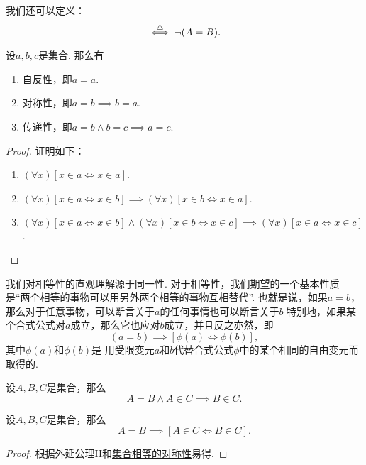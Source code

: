 我们还可以定义：\begin{equation*}
	[A \neq B] \defiff \neg(A=B).
\end{equation*}

\begin{property}
设\(a,b,c\)是集合.
那么有\begin{enumerate}
	\item\label{item:集合论.集合相等的自反性}
	自反性，即\(a=a\).
	\item\label{item:集合论.集合相等的对称性}
	对称性，即\(a=b \implies b=a\).
	\item\label{item:集合论.集合相等的传递性}
	传递性，即\(a=b \land b=c \implies a=c\).
\end{enumerate}
\begin{proof}
证明如下：
\begin{enumerate}
	\item \((\forall x)[x \in a \iff x \in a]\).
	\item \((\forall x)[x \in a \iff x \in b] \implies (\forall x)[x \in b \iff x \in a]\).
	\item \((\forall x)[x \in a \iff x \in b] \land (\forall x)[x \in b \iff x \in c]
	\implies (\forall x)[x \in a \iff x \in c]\).
	\qedhere
\end{enumerate}
\end{proof}
\end{property}

我们对相等性的直观理解源于同一性.
对于相等性，我们期望的一个基本性质是“两个相等的事物可以用另外两个相等的事物互相替代”.
也就是说，如果\(a=b\)，那么对于任意事物，可以断言关于\(a\)的任何事情也可以断言关于\(b\)
特别地，如果某个合式公式对\(a\)成立，那么它也应对\(b\)成立，并且反之亦然，即\begin{equation*}
	(a=b)\implies[\phi(a)\iff\phi(b)],
\end{equation*}
其中\(\phi(a)\)和\(\phi(b)\)是%
用受限变元\(a\)和\(b\)代替合式公式\(\phi\)中的某个相同的自由变元而取得的.

\begin{axiom}[外延公理II]
设\(A,B,C\)是集合，那么\begin{equation*}
	A=B \land A \in C \implies B \in C.
\end{equation*}
\end{axiom}

\begin{property}
设\(A,B,C\)是集合，那么\begin{equation*}
	A=B \implies [A \in C \iff B \in C].
\end{equation*}
\begin{proof}
根据外延公理II和\hyperref[item:集合论.集合相等的对称性]{集合相等的对称性}易得.
\end{proof}
\end{property}

